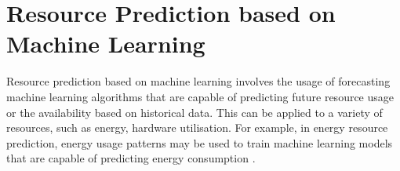     
    \section{Resource Prediction based on Machine Learning}
    \label{sec:resource-prediction-based-on-machine-learning-related-work}
    
        Resource prediction based on machine learning involves the usage of forecasting machine learning algorithms that are capable of predicting future resource usage or the availability based on historical data.
        This can be applied to a variety of resources, such as energy, hardware utilisation.
        For example, in energy resource prediction, energy usage patterns may be used to train machine learning models that are capable of predicting energy consumption \cite{shapiEnergyConsumptionPrediction2021} \cite{richDeepMindAIReduces2016}.

